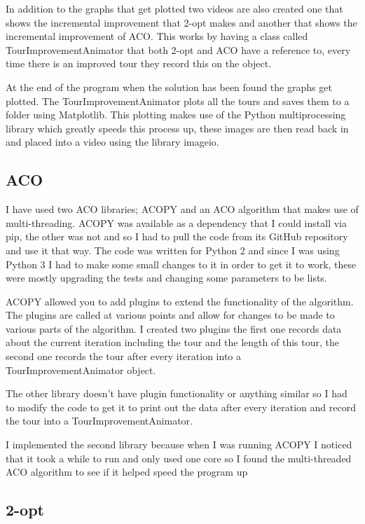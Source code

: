 In addition to the graphs that get plotted two videos are also created one that shows the incremental improvement that 2-opt makes and another that shows the incremental improvement of ACO. This works by having a class called TourImprovementAnimator that both 2-opt and ACO have a reference to, every time there is an improved tour they record this on the object.

At the end of the program when the solution has been found the graphs get plotted. The TourImprovementAnimator plots all the tours and saves them to a folder using Matplotlib\cite{matplotlib}. This plotting makes use of the Python multiprocessing library which greatly speeds this process up, these images are then read back in and placed into a video using the library imageio\cite{imageio}.

\subsection{ACO}

I have used two ACO libraries; ACOPY\cite{acopy} and an ACO algorithm that makes use of multi-threading\cite{multithreaded_aco}. ACOPY was available as a dependency that I could install via pip, the other was not and so I had to pull the code from its GitHub repository and use it that way. The code was written for Python 2 and since I was using Python 3 I had to make some small changes to it in order to get it to work, these were mostly upgrading the tests and changing some parameters to be lists. 

ACOPY allowed you to add plugins to extend the functionality of the algorithm. The plugins are called at various points and allow for changes to be made to various parts of the algorithm. I created two plugins the first one records data about the current iteration including the tour and the length of this tour, the second one records the tour after every iteration into a TourImprovementAnimator object.

The other library doesn't have plugin functionality or anything similar so I had to modify the code to get it to print out the data after every iteration and record the tour into a TourImprovementAnimator.

I implemented the second library because when I was running ACOPY I noticed that it took a while to run and only used one core so I found the multi-threaded ACO algorithm to see if it helped speed the program up

\subsection{2-opt}

